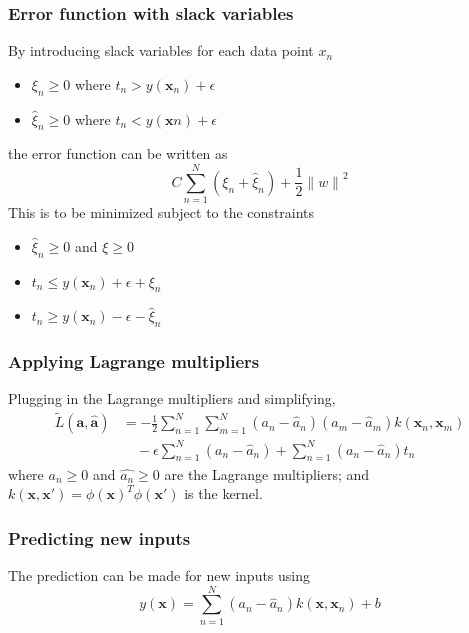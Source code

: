 \documentclass[t,14pt]{beamer}
\begin{document}
\begin{frame}
  \frametitle{Error function with slack variables}
  By introducing slack variables for each data point $x_n$\\
  \begin{itemize}
    \item {$\xi_n \geq 0$ where $t_n > y(\mathbf{x}_n) + 
  \epsilon$} 
    \item {$\widehat{\xi}_n \geq 0$ where $t_n < y(\mathbf{x}n) 
  + \epsilon$} 
  \end{itemize}
  the error function can be written as
  \begin{equation}
    C \sum\limits_{n=1}^N (\xi_n + \widehat{\xi}_n) + 
        \frac{\displaystyle 1}{\displaystyle 2}{\lVert w \rVert}^2
  \end{equation}
  This is to be minimized subject to the constraints
  \begin{itemize}
    \item {$\widehat{\xi}_n \geq 0$ and $\xi \geq 0$}
    \item {$t_n \leq y(\mathbf{x}_n) + \epsilon + \xi_n$}
    \item {$t_n \geq y(\mathbf{x}_n) - \epsilon - \widehat{\xi}_n$}
  \end{itemize}
\end{frame}

\begin{frame}
  \frametitle{Applying Lagrange multipliers}
  Plugging in the Lagrange multipliers and simplifying,
  \begin{align} 
    \widetilde{L}(\mathbf{a}, \widehat{\mathbf{a}}) &= 
        -\frac{\displaystyle 1}{\displaystyle 2}
        \sum\limits_{n=1}^N \sum\limits_{m=1}^N 
            (a_n - \widehat{a}_n)(a_m - \widehat{a}_m)
            k(\mathbf{x}_n,\mathbf{x}_m) \nonumber \\
            &\quad - \epsilon \sum\limits_{n=1}^N(a_n - \widehat{a}_n)
            + \sum\limits_{n=1}^N(a_n - \widehat{a}_n)t_n
  \end{align}
  where $a_n \geq 0$ and $\widehat{a_n} \geq 0$ are the Lagrange multipliers; 
  and\\
  $k(\mathbf{x}, \mathbf{x'}) = \phi(\mathbf{x})^T \phi(\mathbf{x'})$ is the 
  kernel.
\end{frame} 

\begin{frame}
  \frametitle{Predicting new inputs}
  The prediction can be made for new inputs using
  \begin{equation}
    y(\mathbf{x}) = \sum\limits_{n=1}^N (a_n - \widehat{a}_n)
                                        k(\mathbf{x}, \mathbf{x}_n)
                    + b
  \end{equation}
\end{frame}
\end{document}
